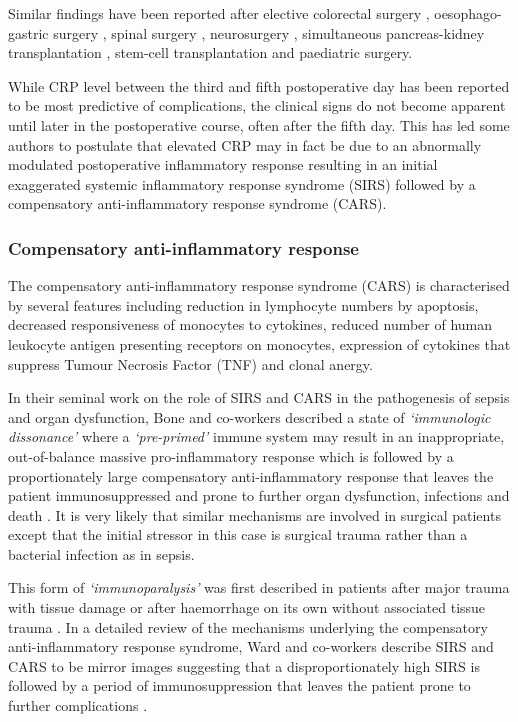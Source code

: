 Similar findings have been reported after elective colorectal surgery \parencite{ortega-deballon_c-reactive_2010, woeste_increased_2010}, oesophago-gastric surgery \parencite{dutta_persistent_2011}, spinal surgery \parencite{meyer_c-reactive_1995,mok_use_2008}, neurosurgery \parencite{al-jabi_value_2010}, simultaneous pancreas-kidney transplantation \parencite{wullstein_high_2004}, stem-cell transplantation \parencite{mcneer_early_2010} and paediatric surgery\parencite{laporta_baez_c-reactive_2011}.

While CRP level between the third and fifth postoperative day has been reported to be most predictive of complications, the clinical signs do not become apparent until later in the postoperative course, often after the fifth day. 
This has led some authors to postulate that elevated CRP may in fact be due to an abnormally modulated postoperative inflammatory response resulting in an initial exaggerated systemic inflammatory response syndrome (SIRS) followed by a compensatory anti-inflammatory response syndrome (CARS). 

\subsubsection{Compensatory anti-inflammatory response}
The compensatory anti-inflammatory response syndrome (CARS) is characterised by several features including reduction in lymphocyte numbers by apoptosis, decreased responsiveness of monocytes to cytokines, reduced number of human leukocyte antigen presenting receptors on monocytes, expression of cytokines that suppress Tumour Necrosis Factor (TNF) and clonal anergy.

In their seminal work on the role of SIRS and CARS in the pathogenesis of sepsis and organ dysfunction, Bone and co-workers described a state of \textit{`immunologic dissonance'} where a \textit{`pre-primed'} immune system may result in an inappropriate, out-of-balance massive pro-inflammatory response which is followed by a proportionately large compensatory anti-inflammatory response that leaves the patient immunosuppressed and prone to further organ dysfunction, infections and death \parencite{bone_sepsis:_1997, bone_immunologic_1996}. 
It is very likely that similar mechanisms are involved in surgical patients except that the initial stressor in this case is surgical trauma rather than a bacterial infection as in sepsis. 

This form of \textit{`immunoparalysis'} was first described in patients after major trauma with tissue damage \parencite{abraham_effects_1985,bandyopadhyay_negative_2007} or after haemorrhage on its own without associated tissue trauma \parencite{stephan_hemorrhage_1987}. 
In a detailed review of the mechanisms underlying the compensatory anti-inflammatory response syndrome, Ward and co-workers describe SIRS and CARS to be mirror images suggesting that a disproportionately high SIRS is followed by a period of immunosuppression that leaves the patient prone to further complications \parencite{ward_compensatory_2008}. 

